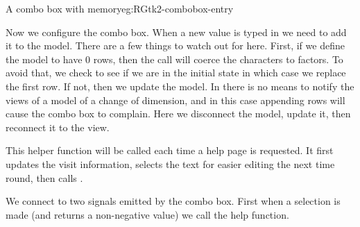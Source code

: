 \begin{example}{A combo box with memory}{eg:RGtk2-combobox-entry}


Now we configure the combo box. When a new value is typed in we need to
add it to the model. There are a few things to watch out for
here. First, if we define the model to have $0$ rows, then the
 call will coerce the characters to factors. To avoid
that, we check to see if we are in the initial state in which case we
replace the first row. If not, then we update the model. In \GTK\/
there is no means to notify the views of a model of a change of
dimension, and in this case appending rows will cause the combo box to
complain. Here we disconnect the model, update it, then reconnect it
to the view.
\begin{Schunk}
\end{Schunk}

This helper function will be called each time a help page is
requested. It first updates the visit information, selects the
text for easier editing the next time round, then calls  .
\begin{Schunk}
\end{Schunk}

We connect to two signals emitted by the combo box. First when a
selection is made (and   returns a
non-negative value) we call the help function.
\begin{Schunk}
\end{Schunk}


\end{example}
